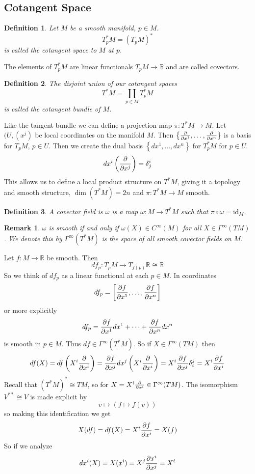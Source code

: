 \documentclass[a4paper]{article}
\newtheorem*{defn}{Definition}
\newtheorem*{rem}{Remark}
\begin{document}
\subsection*{Cotangent Space}%
\begin{defn}
  Let $M$ be a smooth manifold, $p \in M$. 
  \[
    T_p^*M = (T_pM)^*
  \]
  is called the cotangent space to $M$ at $p$. 
\end{defn}
The elements of $T_p^*M$ are linear functionals $T_pM \rightarrow \mathds{R}$ and are called covectors. 
\begin{defn}
 The disjoint union of our cotangent spaces
 \[
   T^*M = \coprod_{p \in M} T_p^*M
 \]
 is called the cotangent bundle of $M$.
\end{defn}
Like the tangent bundle we can define a projection map $\pi: T^*M \rightarrow M$. Let $(U, (x^j)$ be local coordinates on the manifold $M$. Then $\left\{ \pdv{x^1}, \dots, \pdv{x^n} \right\}$ is a basis for $T_pM$, $p \in U$. Then we create the dual basis $ \left\{ dx^1, \dots, dx^n \right\}$ for $T_p^*M$ for $p \in U$.
\[
  dx^i\left(\pdv{x^j}\right)= \delta_j^i
\]
This allows us to define a local product structure on $T^*M$, giving it a topology and smooth structure, $\dim(T^*M) = 2n$ and $\pi: T^*M \rightarrow M$ smooth. 
\begin{defn}
  A covector field is $\omega$ is a map $\omega: M \rightarrow T^*M$ such that $\pi \circ \omega = \text{id}_M$.
\end{defn}
\begin{rem}
  $\omega$ is smooth if and only if $\omega(X) \in C^\infty(M)$ for all $X \in \Gamma^{\infty}(TM)$. We denote this by $\Gamma^{\infty}(T^*M)$ is the space of all smooth covector fields on $M$.
\end{rem}

Let $f: M \rightarrow \mathds{R}$ be smooth. Then
\[
  df_p: T_pM \rightarrow T_{f(p)}\mathds{R} \cong  \mathds{R}
\] 
So we think of $df_p$ as a linear functional at each $p \in M$. In coordinates
\[
  df_p = \left[ \pdv{f}{x^1}, \dots, \pdv{f}{x^n} \right]
\]
or more explicitly
\[
  df_p = \pdv{f}{x^1} dx^1 + \dots + \pdv{f}{x^n} dx^n
\]
is smooth in $p \in M$. Thus $df \in \Gamma^{\infty}(T^*M)$. So if $X \in \Gamma^{\infty}(TM)$ then
\[
  df(X) = df \left( X^i \pdv{x^i} \right) = \pdv{f}{x^j} dx^j \left(X^i \pdv{x^i}\right) = X^i \pdv{f}{x^j} \delta_i^j = X^i \pdv{f}{x^i}
\]
Recall that $(T^*M)^* \cong TM$, so for $X = X^i \pdv{x^i} \in \Gamma^{\infty}(TM)$. The isomorphism $V^{**} \cong V$ is made explicit by
\[
  v \mapsto (f \mapsto f(v))
\]
so making this identification we get
\[
  X(df) = df(X) = X^i \pdv{f}{x^i} = X(f)
\]
So if we analyze
\[
  dx^i(X) = X(x^i) = X^j \pdv{x^i}{x^j} = X^i
\]
\end{document}
